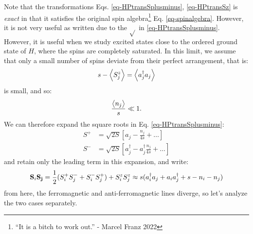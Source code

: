 Note that the transformations Eqs. \eqref{eq-HPtransSplusminus}, \eqref{eq-HPtransSz} is \emph{exact} in that it satisfies the original spin algebra\footnote{``It is a bitch to work out.'' - Marcel Franz 2022} Eq. \eqref{eq-spinalgebra}. However, it is not very useful as written due to the $\sqrt{}$ in \eqref{eq-HPtransSplusminus}. However, it is useful when we study excited states close to the ordered ground state of $H$, where the spins are completely saturated. In this limit, we assume that only a small number of spins deviate from their perfect arrangement, that is:
\begin{equation}
    s - \left< S_j^z \right> = \left< a_j^\dagger a_j \right>
\end{equation}
is small, and so:
\begin{equation}
    \frac{\left< n_j \right>}{s} \ll 1.
\end{equation}
We can therefore expand the square roots in Eq. \eqref{eq-HPtransSplusminus}:
\begin{equation}
    \begin{split}
        S^+ &= \sqrt{2S}\left[a_j - \frac{n_j}{4s} + \ldots \right]
        \\ S^- &= \sqrt{2S}\left[a_j^\dag - a_j^\dag \frac{n_j}{4s} + \ldots \right]
    \end{split}
\end{equation}
and retain only the leading term in this expansion, and write:
\begin{equation}
    \mathbf{S}_i\mathbf{S_j} = \frac{1}{2}(S_i^+ S_j^- + S_i^-S_j^+) + S_i^z S_j^z \approx s(a_i^\dagger a_j + a_i a_j^\dagger + s - n_i - n_j)
\end{equation}
from here, the ferromagnetic and anti-ferromagnetic lines diverge, so let's analyze the two cases separately.

